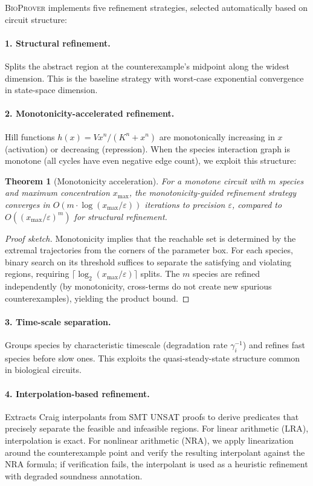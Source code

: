 \documentclass[11pt]{article}
\newtheorem{theorem}{Theorem}
\newcommand{\bioprover}{\textsc{BioProver}}
\begin{document}
\bioprover{} implements five refinement strategies, selected
automatically based on circuit structure:

\paragraph{1. Structural refinement.}
Splits the abstract region at the counterexample's midpoint along the
widest dimension. This is the baseline strategy with worst-case
exponential convergence in state-space dimension.

\paragraph{2. Monotonicity-accelerated refinement.}
Hill functions $h(x) = V x^n/(K^n + x^n)$ are monotonically
increasing in $x$ (activation) or decreasing (repression). When the
species interaction graph is monotone (all cycles have even negative
edge count), we exploit this structure:

\begin{theorem}[Monotonicity acceleration]
\label{thm:mono}
For a monotone circuit with $m$ species and maximum concentration
$x_{\max}$, the monotonicity-guided refinement strategy converges in
$O(m \cdot \log(x_{\max}/\varepsilon))$ iterations to precision
$\varepsilon$, compared to $O((x_{\max}/\varepsilon)^m)$ for
structural refinement.
\end{theorem}

\begin{proof}[Proof sketch]
Monotonicity implies that the reachable set is determined by the
extremal trajectories from the corners of the parameter box. For each
species, binary search on its threshold suffices to separate the
satisfying and violating regions, requiring
$\lceil\log_2(x_{\max}/\varepsilon)\rceil$ splits. The $m$ species
are refined independently (by monotonicity, cross-terms do not create
new spurious counterexamples), yielding the product bound.
\end{proof}

\paragraph{3. Time-scale separation.}
Groups species by characteristic timescale (degradation rate
$\gamma_i^{-1}$) and refines fast species before slow ones. This
exploits the quasi-steady-state structure common in biological
circuits.

\paragraph{4. Interpolation-based refinement.}
Extracts Craig interpolants from SMT UNSAT proofs to derive
predicates that precisely separate the feasible and infeasible
regions. For linear arithmetic (LRA), interpolation is exact. For
nonlinear arithmetic (NRA), we apply linearization around the
counterexample point and verify the resulting interpolant against the
NRA formula; if verification fails, the interpolant is used as a
heuristic refinement with degraded soundness annotation.
\end{document}
